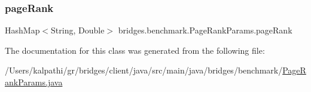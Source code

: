 \subsubsection{\texorpdfstring{page\+Rank}{pageRank}}
{\footnotesize\ttfamily Hash\+Map$<$String, Double$>$ bridges.\+benchmark.\+Page\+Rank\+Params.\+page\+Rank}



The documentation for this class was generated from the following file\+:\begin{DoxyCompactItemize}
\item 
/\+Users/kalpathi/gr/bridges/client/java/src/main/java/bridges/benchmark/\mbox{\hyperlink{_page_rank_params_8java}{Page\+Rank\+Params.\+java}}\end{DoxyCompactItemize}
